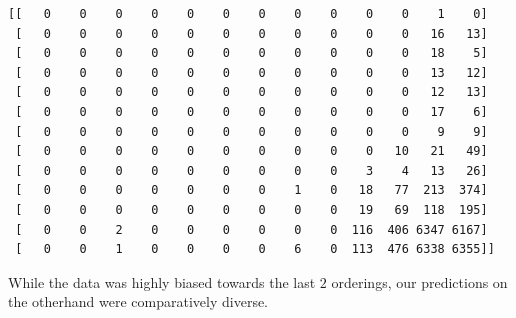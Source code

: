 \begin{lstlisting}[caption=Confusion matrix for DQN classificaiton, label={lst:confusion_matrix}]
[[   0    0    0    0    0    0    0    0    0    0    0    1    0]
 [   0    0    0    0    0    0    0    0    0    0    0   16   13]
 [   0    0    0    0    0    0    0    0    0    0    0   18    5]
 [   0    0    0    0    0    0    0    0    0    0    0   13   12]
 [   0    0    0    0    0    0    0    0    0    0    0   12   13]
 [   0    0    0    0    0    0    0    0    0    0    0   17    6]
 [   0    0    0    0    0    0    0    0    0    0    0    9    9]
 [   0    0    0    0    0    0    0    0    0    0   10   21   49]
 [   0    0    0    0    0    0    0    0    0    3    4   13   26]
 [   0    0    0    0    0    0    0    1    0   18   77  213  374]
 [   0    0    0    0    0    0    0    0    0   19   69  118  195]
 [   0    0    2    0    0    0    0    0    0  116  406 6347 6167]
 [   0    0    1    0    0    0    0    6    0  113  476 6338 6355]]
\end{lstlisting}
While the data was highly biased towards the last $2$ orderings, our predictions on the otherhand were comparatively diverse.


